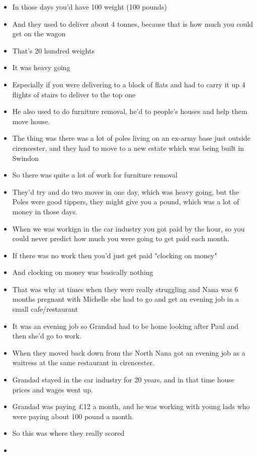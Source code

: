 \documentclass[10pt,twocolumn,letterpaper]{article}
\begin{document}
\begin{itemize}
    \item In those days you'd have 100 weight (100 pounds)
    \item And they used to deliver about 4 tonnes, because that is how much you could get on the wagon
    \item That's 20 hundred weights
    \item It was heavy going
    \item Especially if you were delivering to a block of flats and had to carry it up 4 flights of stairs to deliver to the top one
    \item He also used to do furniture removal, he'd to people's houses and help them move house.
    \item The thing was there was a lot of poles living on an ex-army base just outside cirencester, and they had to move to a new estate which was being built in Swindon
    \item So there was quite a lot of work for furniture removal
    \item They'd try and do two moves in one day, which was heavy going, but the Poles were good tippers, they might give you a pound, which was a lot of money in those days.
    \item When we was workign in the car industry you got paid by the hour, so you could never predict how much you were going to get paid each month.
    \item If there was no work then you'd just get paid "clocking on money"
    \item And clocking on money was basically nothing
    \item That was why at times when they were really struggling and Nana was 6 months pregnant with Michelle she had to go and get an evening job in a small cafe/restaurant
    \item It was an evening job so Grandad had to be home looking after Paul and then she'd go to work.
    \item When they moved back down from the North Nana got an evening job as a waitress at the same restaurant in cirencester.
    \item Grandad stayed in the car industry for 20 years, and in that time house prices and wages went up.
    \item Grandad was paying £12 a month, and he was working with young lads who were paying about 100 pound a month.
    \item So this was where they really scored
    \item 

\end{itemize}
\end{document}
